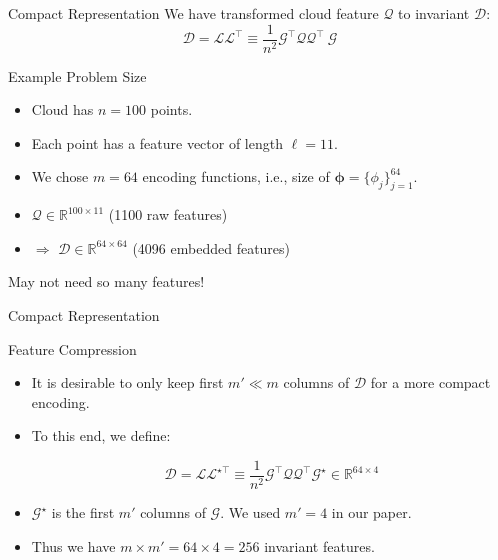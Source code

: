 \documentclass[presentation,aspectratio=169]{beamer}
\begin{document}
\begin{frame}[label={sec:org20ab6c4}]{Compact Representation}
We have transformed cloud feature \(\mathcal{Q}\)
to invariant \(\mathcal{D}\):
\[
\mathcal{D} = \mathcal{L} \mathcal{L}^{\top} \equiv
\frac{1}{n^2}\mathcal{G}^\top \mathcal{Q} \mathcal{Q}^\top\ \mathcal{G}
\]

\begin{block}{Example Problem Size}
\begin{itemize}
\item Cloud has \(n=100\) points.

\item Each point has a feature vector of length \(\ell = 11\).

\item We chose \(m = 64\) encoding functions, i.e., size of
\(\bm{\phi} = \{\phi_j\}_{j=1}^{64}\).

\item \(\mathcal{Q}\in \mathbb{R}^{100 \times 11}\) (1100 raw features)

\item \(\Longrightarrow\) \(\mathcal{D}\in \mathbb{R}^{64 \times 64}\) (4096
embedded features)
\end{itemize}
\end{block}

\alert{May not need so many features!}
\end{frame}

\begin{frame}[label={sec:org3a5a3ea}]{Compact Representation}
\begin{block}{Feature Compression}
\begin{itemize}
\item It is desirable to only keep first \(m' \ll m\) columns of
\(\mathcal{D}\) for a more compact encoding.
\item To this end, we define:

\[ \mathcal{D} = \mathcal{L} \mathcal{L}^{\star \top}
  \equiv \frac{1}{n^2}\mathcal{G}^\top \mathcal{Q} \mathcal{Q}^\top
  \mathcal{G}^\star \in \mathbb{R}^{64 \times 4} \]
\end{itemize}
\end{block}

\begin{itemize}
\item \(\mathcal{G}^\star\) is the first \(m'\) columns of \(\mathcal{G}\). We
used \(m' = 4\) in our paper.
\item Thus we have \(m\times m' = 64 \times 4 = 256\) invariant features.
\end{itemize}
\end{frame}
\end{document}
